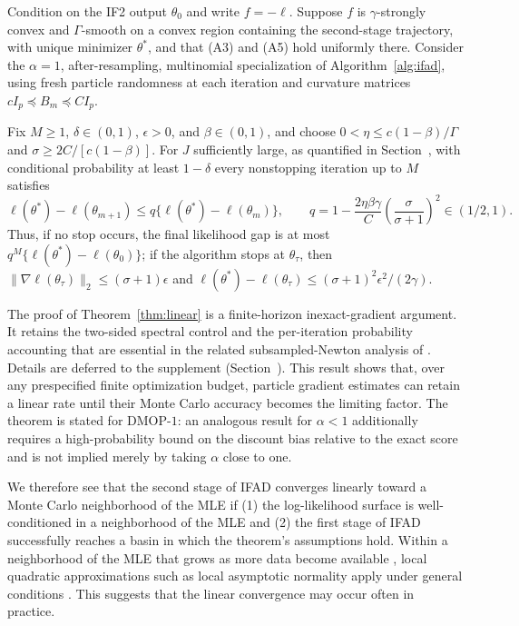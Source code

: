 \documentclass[11pt]{article}
\begin{document}
\begin{thm}
\label{thm:linear}\label{thm:mop-convergence}
Condition on the IF2 output $\theta_0$ and write $f=-\ell$.  Suppose $f$ is
$\gamma$-strongly convex and $\Gamma$-smooth on a convex region containing the
second-stage trajectory, with unique minimizer $\theta^*$, and that (A3) and
(A5) hold uniformly there.  Consider the $\alpha=1$, after-resampling,
multinomial specialization of Algorithm~\ref{alg:ifad}, using fresh particle
randomness at each iteration and curvature matrices
$cI_p\preceq B_m\preceq CI_p$.

Fix $M\geq1$, $\delta\in(0,1)$, $\epsilon>0$, and $\beta\in(0,1)$, and choose
$0<\eta\leq c(1-\beta)/\Gamma$ and
$\sigma\geq2C/[c(1-\beta)]$.  For $J$ sufficiently large, as quantified in
Section~\suppSecProofOptimizationConvergence, with conditional probability at
least $1-\delta$ every nonstopping iteration up to $M$ satisfies
\[
\ell(\theta^*)-\ell(\theta_{m+1})
\leq q\{\ell(\theta^*)-\ell(\theta_m)\},
\qquad
q=1-\frac{2\eta\beta\gamma}{C}
\left(\frac{\sigma}{\sigma+1}\right)^2\in(1/2,1).
\]
Thus, if no stop occurs, the final likelihood gap is at most
$q^M\{\ell(\theta^*)-\ell(\theta_0)\}$; if the algorithm stops at
$\theta_\tau$, then
$\|\nabla\ell(\theta_\tau)\|_2\leq(\sigma+1)\epsilon$ and
$\ell(\theta^*)-\ell(\theta_\tau)
\leq(\sigma+1)^2\epsilon^2/(2\gamma)$.
\end{thm}
The proof of Theorem~\ref{thm:linear} is a finite-horizon inexact-gradient
argument.  It retains the two-sided spectral control and the per-iteration
probability accounting that are essential in the related subsampled-Newton
analysis of \cite{mahoney16}.
Details are deferred to the supplement (Section~\suppSecProofOptimizationConvergence). 
This result shows that, over any prespecified finite optimization budget,
particle gradient estimates can retain a linear rate until their Monte Carlo
accuracy becomes the limiting factor.  The theorem is stated for DMOP-$1$:
an analogous result for $\alpha<1$ additionally requires a high-probability
bound on the discount bias relative to the exact score and is not implied merely
by taking $\alpha$ close to one.

We therefore see that the second stage of IFAD converges linearly toward a
Monte Carlo neighborhood of the MLE if (1) the log-likelihood surface is
well-conditioned in a neighborhood of the MLE and (2) the first stage of IFAD
successfully reaches a basin in which the theorem's assumptions hold.
Within a neighborhood of the MLE that grows as more data become available \citep{ning21}, local quadratic approximations such as local asymptotic normality apply under general conditions \citep{lecam00}.
This suggests that the linear convergence may occur often in practice.
\end{document}
